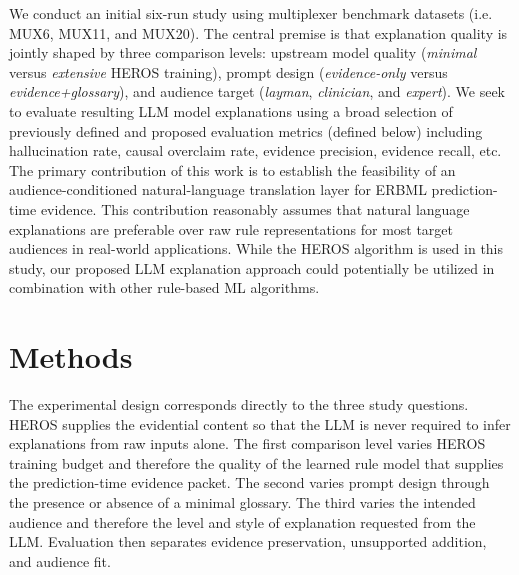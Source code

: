 \documentclass[sigconf]{acmart}
\begin{document}
We conduct an initial six-run study using multiplexer benchmark datasets (i.e. MUX6, MUX11, and MUX20). The central premise is that explanation quality is jointly shaped by three comparison levels: upstream model quality (\emph{minimal} versus \emph{extensive} HEROS training), prompt design (\emph{evidence-only} versus \emph{evidence+glossary}), and audience target (\emph{layman}, \emph{clinician}, and \emph{expert}). We seek to evaluate resulting LLM model explanations using a broad selection of previously defined and proposed evaluation metrics (defined below) including hallucination rate, causal overclaim rate, evidence precision, evidence recall, etc. The primary contribution of this work is to establish the feasibility of an audience-conditioned natural-language translation layer for ERBML prediction-time evidence. This contribution reasonably assumes that natural language explanations are preferable over raw rule representations for most target audiences in real-world applications. While the HEROS algorithm is used in this study, our proposed LLM explanation approach could potentially be utilized in combination with other rule-based ML algorithms. 







\section{Methods}
The experimental design corresponds directly to the three study questions. HEROS supplies the evidential content so that the LLM is never required to infer explanations from raw inputs alone. The first comparison level varies HEROS training budget and therefore the quality of the learned rule model that supplies the prediction-time evidence packet. The second varies prompt design through the presence or absence of a minimal glossary. The third varies the intended audience and therefore the level and style of explanation requested from the LLM. Evaluation then separates evidence preservation, unsupported addition, and audience fit.
\end{document}
